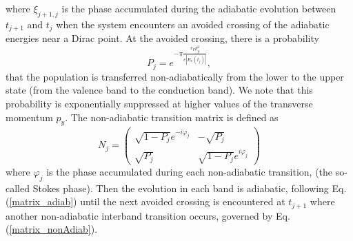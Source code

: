 \documentclass[9pt,twocolumn,twoside]{osajnl}
\begin{document}
where $\xi_{j+1,j}$ is the phase accumulated during the adiabatic evolution between $t_{j+1}$ and $t_j$ when  the system encounters an avoided crossing of the adiabatic energies near a Dirac point. At the avoided crossing, there is a probability 
\begin{equation}
P_{j}=e^{-\pi \frac{v_F p_y^2}{e|E_x(t_j)|}}, 
\end{equation}
that the  population is transferred non-adiabatically from the lower to the upper state (from the valence band  to the conduction band). We note that this probability is exponentially suppressed at higher values of the transverse momentum $p_y$.
The non-adiabatic transition matrix is defined as \cite{Shevchenko20101,PhysRevA.75.063414}
\begin{equation}\label{matrix_nonAdiab}
	N_j=
	\begin{pmatrix}
		\sqrt{1-P_j} e^{-i\varphi_j}& -\sqrt{P_j} \\ \sqrt{P_j} & \sqrt{1-P_j}e^{i\varphi_j}
	\end{pmatrix}
\end{equation}	
where $\varphi_j$ is the phase accumulated during each non-adiabatic transition, (the so-called Stokes phase).
Then the evolution in each band is adiabatic, following Eq. (\ref{matrix_adiab}) until the next avoided crossing is encountered at $t_{j+1}$  where another non-adiabatic interband transition occurs, governed by Eq. (\ref{matrix_nonAdiab}).   
 
\end{document}

